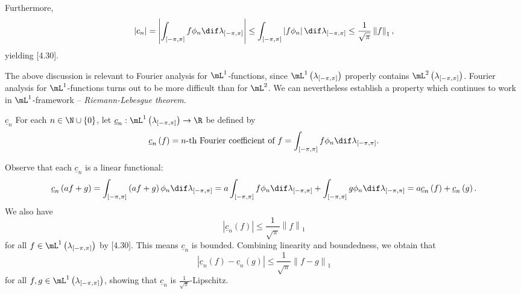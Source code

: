 \documentclass[pmath450]{subfiles}
\begin{document}
    Furthermore,
    \begin{equation*}
        \left| c_n \right| = \left| \int_{\left[ -\pi,\pi \right]}f\phi_n\dif\lambda_{\left[ -\pi,\pi \right]} \right| \leq 
        \int^{}_{\left[ -\pi,\pi \right]} \left| f\phi_n \right|\dif\lambda_{\left[ -\pi,\pi \right]} \leq \frac{1}{\sqrt{\pi}} \left\lVert f \right\rVert_{1},
    \end{equation*}
    yielding [4.30].
    
    \np The above discussion is relevant to Fourier analysis for $\lone$-functions, since $\lone\left( \lambda_{\left[ -\pi,\pi \right]} \right)$ properly contains $\mL^{2}\left( \lambda_{\left[ -\pi,\pi \right]} \right)$. Fourier analysis for $\lone$-functions turns out to be more difficult than for $\mL^{2}$. We can nevertheless establish a property which continues to work in $\lone$-framework -- \textit{Riemann-Lebesgue theorem}.

    \begin{notation}{$\underline{c}_n$}
        For each $n\in\N\cup\left\lbrace 0 \right\rbrace$, let $\underline{c}_n:\lone\left( \lambda_{\left[ -\pi,\pi \right]} \right)\to\R$ be defined by
        \begin{equation*}
            \underline{c}_n\left( f \right) = \text{$n$-th Fourier coefficient of $f$} = \int^{}_{\left[ -\pi,\pi \right]} f\phi_n\dif\lambda_{\left[ -\pi,\pi \right]}.
        \end{equation*}
    \end{notation}
    
    \np Observe that each $\underline{c}_n$ is a linear functional:
    \begin{equation*}
        \underline{c}_n\left( af+g \right) = \int^{}_{\left[ -\pi,\pi \right]} \left( af+g \right)\phi_n\dif\lambda_{\left[ -\pi,\pi \right]} = a\int^{}_{\left[ -\pi,\pi \right]}f\phi_n\dif\lambda_{\left[ -\pi,\pi \right]} + \int^{}_{\left[ -\pi,\pi \right]}g\phi_n\dif\lambda_{\left[ -\pi,\pi \right]} = a\underline{c}_n\left( f \right)+\underline{c}_n\left( g \right).
    \end{equation*}
    We also have
    \begin{equation*}
        \left| \underline{c}_n\left( f \right) \right| \leq \frac{1}{\sqrt{\pi}} \left\lVert f \right\rVert_{1} 
    \end{equation*}
    for all $f\in\lone\left( \lambda_{\left[ -\pi,\pi \right]} \right)$ by [4.30]. This means $\underline{c}_n$ is bounded. Combining linearity and boundedness, we obtain that
    \begin{equation*}
        \left| \underline{c}_n\left( f \right)-\underline{c}_n\left( g \right) \right| \leq \frac{1}{\sqrt{\pi}} \left\lVert f-g \right\rVert_{1}
    \end{equation*}
    for all $f,g\in\lone\left( \lambda_{\left[ -\pi,\pi \right]} \right)$, showing that $\underline{c}_n$ is $\frac{1}{\sqrt{\pi}}$-Lipschitz.
\end{document}
